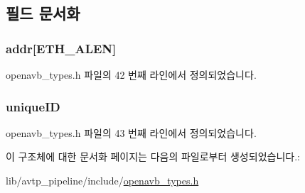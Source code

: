 \subsection{필드 문서화}
\subsubsection[{\texorpdfstring{addr}{addr}}]{ addr\mbox{[}{\bf E\+T\+H\+\_\+\+A\+L\+EN}\mbox{]}}\hypertarget{struct_a_v_b_stream_i_d__t_a48d52ffa49f2036631c913b36c85de02}{}\label{struct_a_v_b_stream_i_d__t_a48d52ffa49f2036631c913b36c85de02}


openavb\+\_\+types.\+h 파일의 42 번째 라인에서 정의되었습니다.

\subsubsection[{\texorpdfstring{unique\+ID}{uniqueID}}]{ unique\+ID}\hypertarget{struct_a_v_b_stream_i_d__t_a7f5a958848a2b027d9f08e063b2e16a1}{}\label{struct_a_v_b_stream_i_d__t_a7f5a958848a2b027d9f08e063b2e16a1}


openavb\+\_\+types.\+h 파일의 43 번째 라인에서 정의되었습니다.



이 구조체에 대한 문서화 페이지는 다음의 파일로부터 생성되었습니다.\+:\begin{DoxyCompactItemize}
\item 
lib/avtp\+\_\+pipeline/include/\hyperlink{openavb__types_8h}{openavb\+\_\+types.\+h}\end{DoxyCompactItemize}
